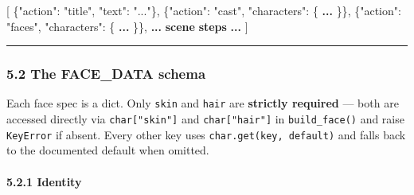 \documentclass[
  11pt,
]{book}
\newenvironment{Shaded}{}{}
\newcommand{\DataTypeTok}[1]{\textcolor[rgb]{0.56,0.13,0.00}{#1}}
\newcommand{\ErrorTok}[1]{\textcolor[rgb]{1.00,0.00,0.00}{\textbf{#1}}}
\newcommand{\FunctionTok}[1]{\textcolor[rgb]{0.02,0.16,0.49}{#1}}
\newcommand{\OtherTok}[1]{\textcolor[rgb]{0.00,0.44,0.13}{#1}}
\newcommand{\StringTok}[1]{\textcolor[rgb]{0.25,0.44,0.63}{#1}}
\begin{document}
\begin{Shaded}
\begin{Highlighting}[]
\OtherTok{[}
  \FunctionTok{\{}\DataTypeTok{"action"}\FunctionTok{:} \StringTok{"title"}\FunctionTok{,} \DataTypeTok{"text"}\FunctionTok{:} \StringTok{"..."}\FunctionTok{\}}\OtherTok{,}
  \FunctionTok{\{}\DataTypeTok{"action"}\FunctionTok{:} \StringTok{"cast"}\FunctionTok{,}  \DataTypeTok{"characters"}\FunctionTok{:} \FunctionTok{\{} \ErrorTok{...} \FunctionTok{\}\}}\OtherTok{,}
  \FunctionTok{\{}\DataTypeTok{"action"}\FunctionTok{:} \StringTok{"faces"}\FunctionTok{,} \DataTypeTok{"characters"}\FunctionTok{:} \FunctionTok{\{} \ErrorTok{...} \FunctionTok{\}\}}\OtherTok{,}
  \ErrorTok{...} \ErrorTok{scene} \ErrorTok{steps} \ErrorTok{...}
\OtherTok{]}
\end{Highlighting}
\end{Shaded}

\begin{center}\rule{0.5\linewidth}{0.5pt}\end{center}

\subsubsection{5.2 The FACE\_DATA schema}\label{the-face_data-schema}

Each face spec is a dict. Only \texttt{skin} and \texttt{hair} are
\textbf{strictly required} --- both are accessed directly via
\texttt{char{[}"skin"{]}} and \texttt{char{[}"hair"{]}} in
\texttt{build\_face()} and raise \texttt{KeyError} if absent. Every
other key uses \texttt{char.get(key,\ default)} and falls back to the
documented default when omitted.

\paragraph{5.2.1 Identity}\label{identity2}
\end{document}
